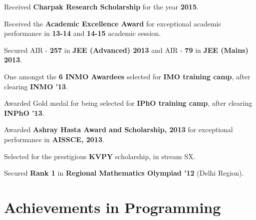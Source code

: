 \documentclass[a4paper]{norm-resume}
\begin{document}
\begin{tightitemize}
	\item Received \textbf{Charpak Research Scholarship} for the year \textbf{2015}.
	\item Received the \textbf{Academic Excellence Award} for exceptional academic performance in \textbf{13-14} and \textbf{14-15} academic session.
	\item Secured AIR - \textbf{257} in {\textbf{JEE (Advanced) 2013}} and AIR - {\textbf{79}} in \textbf{JEE (Mains) 2013}.
	\item One amongst the \textbf{6 INMO Awardees} selected for \textbf{IMO training camp}, after clearing \textbf{INMO '13}.
	\item Awarded Gold medal for being selected for \textbf{IPhO training camp}, after clearing \textbf{INPhO '13}.
	\item Awarded \textbf{Ashray Hasta Award and Scholarship, 2013} for exceptional performance in \textbf{AISSCE, 2013}.
	\item Selected for the prestigious \textbf{KVPY} scholarship, in stream SX.
	\item Secured \textbf{Rank 1} in \textbf{Regional Mathematics Olympiad '12} (Delhi Region).	
\end{tightitemize}
	
\vspace{1mm}	%


\section{Achievements in Programming \hrulefill}

\vspace{3mm} %
\end{document}
